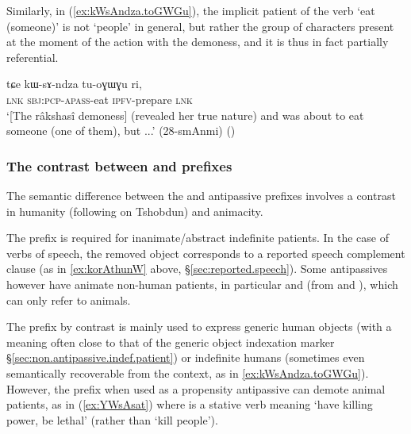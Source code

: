 Similarly, in (\ref{ex:kWsAndza.toGWGu}), the implicit patient of the verb  `eat (someone)' is not `people' in general, but rather the group of characters present at the moment of the action with the demoness, and it is thus in fact partially referential. 

\begin{exe}
\ex \label{ex:kWsAndza.toGWGu}  
\gll tɕe kɯ-sɤ-ndza tu-oɣɯɣu ri,\\
\textsc{lnk} \textsc{sbj}:\textsc{pcp}-\textsc{apass}-eat \textsc{ipfv}-prepare \textsc{lnk} \\
\glt `[The râkshasî demoness] (revealed her true nature) and was about to eat someone (one of them), but ...' (28-smAnmi) ()
\end{exe}

  \subsubsection{The contrast between  and  prefixes  } \label{sec:antipassive.rA.sA}
The semantic difference between the   and  antipassive prefixes involves a contrast in humanity (following \citealt{jackson06paisheng} on Tshobdun) and animacity.

The   prefix is required for inanimate/abstract indefinite patients. In the case of verbs of speech, the removed object corresponds to a reported speech complement clause (as in \ref{ex:korAthunW} above, §\ref{sec:reported.speech}). Some  antipassives however have animate non-human patients, in particular   and   (from    and  ), which can only refer to animals. 

The  prefix by contrast is mainly used to express generic human objects (with a meaning often close to that of the generic object indexation marker  §\ref{sec:non.antipassive.indef.patient}) or indefinite humans (sometimes even semantically recoverable from the context, as in \ref{ex:kWsAndza.toGWGu}). However,  the  prefix when used as a propensity antipassive can demote animal patients, as in (\ref{ex:YWsAsat}) where  is a stative verb meaning `have killing power, be lethal' (rather than `kill people').  
 

